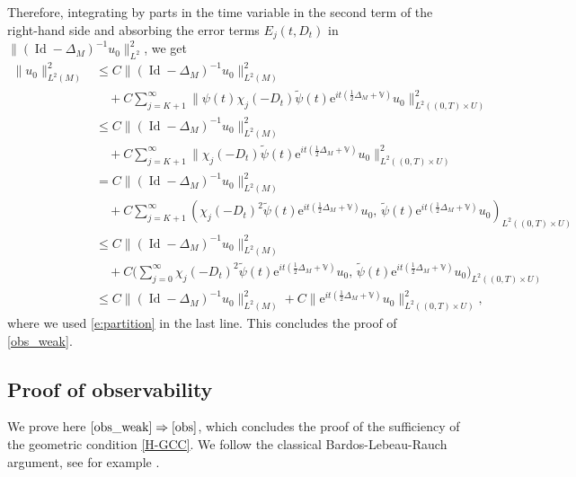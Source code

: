 \documentclass[JEP,XML,SOM,Unicode,published]{cedram}
\newcommand{\rme}{\mathrm{e}}
\DeclareMathOperator{\Id}{Id}
\theoremstyle{plain}
\theoremstyle{definition}
\def\bbV{{\mathbb V}}
\begin{document}
Therefore, integrating by parts in the time variable in the second term of the right-hand side and absorbing the error terms $E_j(t,D_t)$ in $\|(\Id-\Delta_M)^{-1}u_0\|^2_{L^2}$, we get
\begin{align*}
\|u_0\|_{L^2(M)}^2&\leq C\|(\Id-\Delta_M)^{-1}u_0\|^2_{L^2(M)}\\
&\quad+C\sum_{j=K+1}^\infty \|\psi(t)\chi_j(-D_t)\widetilde{\psi}(t) \rme^{it(\frac12 \Delta_M+\bbV)} u_0\|_{L^2((0,T)\times U)}^2 \\
&\leq C\|(\Id-\Delta_M)^{-1}u_0\|^2_{L^2(M)}\\
&\quad+C\sum_{j=K+1}^\infty \|\chi_j(-D_t)\widetilde{\psi}(t) \rme^{it(\frac12 \Delta_M+\bbV)} u_0\|_{L^2((0,T)\times U)}^2 \\
&= C\|(\Id-\Delta_M)^{-1}u_0\|^2_{L^2(M)}\\
&\quad+C\sum_{j=K+1}^\infty \left(\chi_j(-D_t)^2\widetilde{\psi}(t) \rme^{it(\frac12 \Delta_M+\bbV)} u_0,\,\widetilde{\psi}(t) \rme^{it(\frac12 \Delta_M+\bbV)} u_0\right)_{L^2((0,T)\times U)} \\
&\leq C\|(\Id-\Delta_M)^{-1}u_0\|^2_{L^2(M)}\\
&\quad+C \biggl(\sum_{j=0}^\infty \chi_j(-D_t)^2 \widetilde{\psi}(t) \rme^{it(\frac12 \Delta_M+\bbV)} u_0,\, \widetilde{\psi}(t) \rme^{it(\frac12 \Delta_M+\bbV)} u_0 \biggr)_{L^2((0,T)\times U)} \\
&\leq C\|(\Id-\Delta_M)^{-1}u_0\|^2_{L^2(M)}+C\| \rme^{it(\frac12 \Delta_M+\bbV)} u_0\|^2_{L^2((0,T)\times U)},
\end{align*}
where we used \eqref{e:partition} in the last line. This concludes the proof of \eqref{obs_weak}.

\subsection{Proof of observability} \label{s:fromweaktostrongobs}

We prove here $\eqref{obs_weak} \Rightarrow\eqref{obs}$, which concludes the proof of the sufficiency of the geometric condition \eqref{H-GCC}. We follow the classical Bardos-Lebeau-Rauch argument, see for example \cite{BZ}.
\end{document}
